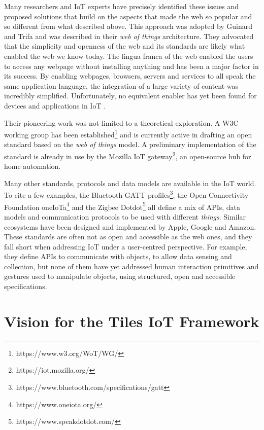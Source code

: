 Many researchers and IoT experts have precisely identified these issues and proposed solutions that build on the aspects that made the web so popular and so different from what described above. This approach was adopted by Guinard and Trifa \autocite*{guinard_building_2016} and was described in their \textit{web of things} architecture. They advocated that the simplicity and openness of the web and its standards are likely what enabled the web we know today. The lingua franca of the web enabled the users to access any webpage without installing anything and has been a major factor in its success. By enabling webpages, browsers, servers and services to all speak the same application language, the integration of a large variety of content was incredibly simplified. Unfortunately, no equivalent enabler has yet been found for devices and applications in IoT \autocite[p. 23]{guinard_building_2016}.

Their pioneering work was not limited to a theoretical exploration. A W3C working group has been established\footnote{https://www.w3.org/WoT/WG/} and is currently active in drafting an open standard based on the \textit{web of things} model. A preliminary implementation of the standard is already in use by the Mozilla IoT gateway\footnote{https://iot.mozilla.org/}, an open-source hub for home automation.

Many other standards, protocols and data models are available in the IoT world. To cite a few examples, the Bluetooth GATT profiles\footnote{https://www.bluetooth.com/specifications/gatt}, the Open Connectivity Foundation oneIoTa\footnote{https://www.oneiota.org/} and the Zigbee Dotdot\footnote{https://www.speakdotdot.com/} all define a mix of APIs, data models and communication protocols to be used with different \textit{things}. Similar ecosystems have been designed and implemented by Apple, Google and Amazon.
These standards are often not as open and accessible as the web ones, and they fall short when addressing IoT under a user-centred perspective. For example, they define APIs to communicate with objects, to allow data sensing and collection, but none of them have yet addressed human interaction primitives and gestures used to manipulate objects, using structured, open and accessible specifications.


\section{Vision for the Tiles IoT Framework}

